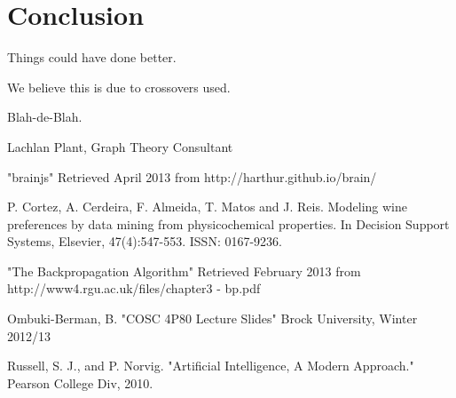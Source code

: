 \documentclass[journal]{IEEEtran}
\begin{document}
\section{Conclusion}
Things could have done better.

We believe this is due to crossovers used.

Blah-de-Blah.





\begin{thebibliography}{1}

Lachlan Plant, Graph Theory Consultant

"brainjs" Retrieved April 2013 from
http://harthur.github.io/brain/

  P. Cortez, A. Cerdeira, F. Almeida, T. Matos and J. Reis.
  Modeling wine preferences by data mining from physicochemical properties.
  In Decision Support Systems, Elsevier, 47(4):547-553. ISSN: 0167-9236.

"The Backpropagation Algorithm" Retrieved February 2013 from
http://www4.rgu.ac.uk/files/chapter3 - bp.pdf

Ombuki-Berman, B. "COSC 4P80 Lecture Slides" Brock University, Winter 2012/13

Russell, S. J., and P. Norvig. "Artificial Intelligence, A Modern Approach." Pearson College Div, 2010.

\end{thebibliography}


\end{document}
